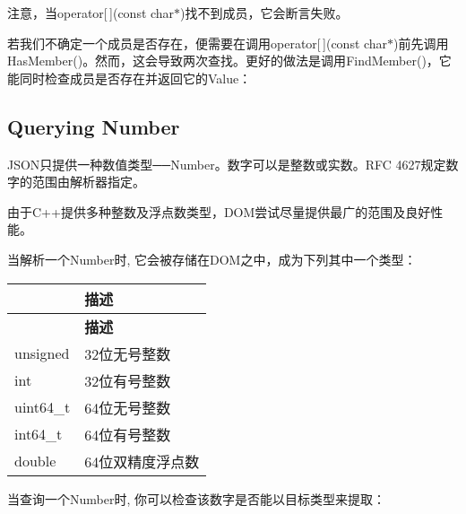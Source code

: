 注意，当{\ttfamily operator\mbox{[}$\,$\mbox{]}(const char$\ast$)}找不到成员，它会断言失败。

若我们不确定一个成员是否存在，便需要在调用{\ttfamily operator\mbox{[}$\,$\mbox{]}(const char$\ast$)}前先调用{\ttfamily Has\+Member()}。然而，这会导致两次查找。更好的做法是调用{\ttfamily Find\+Member()}，它能同时检查成员是否存在并返回它的\+Value：


\hypertarget{md_Commun_Externe_RapidJSON_doc_tutorial.zh-cn_QueryNumber}{}\subsection{Querying Number}\label{md_Commun_Externe_RapidJSON_doc_tutorial.zh-cn_QueryNumber}
J\+S\+O\+N只提供一种数值类型──\+Number。数字可以是整数或实数。\+R\+FC 4627规定数字的范围由解析器指定。

由于\+C++提供多种整数及浮点数类型，\+D\+O\+M尝试尽量提供最广的范围及良好性能。

当解析一个\+Number时, 它会被存储在\+D\+O\+M之中，成为下列其中一个类型：

\tabulinesep=1mm
\begin{longtabu} spread 0pt [c]{*2{|X[-1]}|}
\hline
{}&{\bf 描述  }\\
\endfirsthead
\hline
\endfoot
\hline
{}&{\bf 描述  }\\
\endhead
{\ttfamily unsigned} &32位无号整数 \\
{\ttfamily int} &32位有号整数 \\
{\ttfamily uint64\+\_\+t} &64位无号整数 \\
{\ttfamily int64\+\_\+t} &64位有号整数 \\
{\ttfamily double} &64位双精度浮点数 \\
\end{longtabu}
当查询一个\+Number时, 你可以检查该数字是否能以目标类型来提取：

